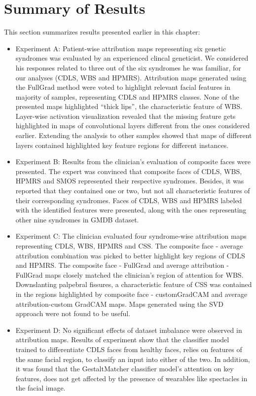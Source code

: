 \documentclass[../report.tex]{subfiles}
\begin{document}
	\section{Summary of Results}
	This section summarizes results presented earlier in this chapter:
	\begin{itemize}
		\item Experiment A: Patient-wise attribution maps representing six genetic syndromes was evaluated by an experienced clincal geneticist. We considered his responses related to three out of the six syndromes he was familiar, for our analyses (CDLS, WBS and HPMRS). Attribution maps generated using the FullGrad method were voted to highlight relevant facial features in majority of samples, representing CDLS and HPMRS classes. None of the presented maps highlighted \enquote{thick lips}, the characteristic feature of WBS. Layer-wise activation visualization revealed that the missing feature gets highlighted in maps of convolutional layers different from the ones considered earlier. Extending the analysis to other samples showed that maps of different layers contained highlighted key feature regions for different instances.
		\item Experiment B: Results from the clinician's evaluation of composite faces were presented. The expert was convinced that composite faces of CDLS, WBS, HPMRS and SMOS represented their respective syndromes. Besides, it was reported that they contained one or two, but not all characteristic features of their corresponding syndromes. Faces of CDLS, WBS and HPMRS labeled with the identified features were presented, along with the ones representing other nine syndromes in GMDB dataset.
		\item Experiment C: The clinician evaluated four syndrome-wise attribution maps representing CDLS, WBS, HPMRS and CSS. The composite face - average attribution combination was picked to better highlight key regions of CDLS and HPMRS. The composite face - FullGrad and average attribution - FullGrad maps closely matched the clinician's region of attention for WBS. Downslanting palpebral fissures, a characteristic feature of CSS was contained in the regions highlighted by composite face - customGradCAM and average attribution-custom GradCAM maps. Maps generated using the SVD approach were not found to be useful.
		\item Experiment D:  No significant effects of dataset imbalance were observed in attribution maps. Results of experiment show that the classifier model trained to differentiate CDLS faces from healthy faces, relies on features of the same facial region, to classify an input into either of the two. In addition, it was found that the GestaltMatcher classifier model's attention on key features, does not get affected by the presence of wearables like spectacles in the facial image.
	\end{itemize}
\end{document}
